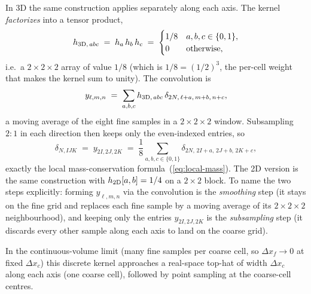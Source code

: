 \documentclass[12pt]{article}
\begin{document}
In 3D the same construction applies separately along each axis. The
kernel \emph{factorizes} into a tensor product,
\begin{equation}
  h_{3{\rm D},\,abc} \;=\; h_a\,h_b\,h_c
                     \;=\; \begin{cases}
                              1/8 & a,b,c\in\{0,1\},\\
                              0   & \text{otherwise},
                            \end{cases}
\end{equation}
i.e.\ a $2\!\times\!2\!\times\!2$ array of value $1/8$ (which is
$1/8 = (1/2)^3$, the per-cell weight that makes the kernel sum to
unity). The convolution is
\begin{equation}
  y_{\ell,m,n} \;=\; \sum_{a,b,c} h_{3{\rm D},\,abc}\,
                    \delta_{2N,\,\ell+a,\,m+b,\,n+c},
\end{equation}
a moving average of the eight fine samples in a $2\!\times\!2\!\times\!2$
window. Subsampling $2{:}1$ in each direction then keeps only the
even-indexed entries, so
\begin{equation}
  \delta_{N,IJK} \;=\; y_{2I,2J,2K}
                  \;=\; \frac{1}{8}\!\!\sum_{a,b,c\in\{0,1\}}\!\!
                        \delta_{2N,\,2I+a,\,2J+b,\,2K+c},
\end{equation}
exactly the local mass-conservation formula~(\ref{eq:local-mass}). The
2D version is the same construction with $h_{2{\rm D}}[a,b]=1/4$ on a
$2\!\times\!2$ block. To name the two steps explicitly: forming
$y_{\ell,m,n}$ via the convolution is the \emph{smoothing} step (it
stays on the fine grid and replaces each fine sample by a moving
average of its $2{\times}2{\times}2$ neighbourhood), and keeping only
the entries $y_{2I,2J,2K}$ is the \emph{subsampling} step (it discards
every other sample along each axis to land on the coarse grid).

In the continuous-volume limit (many fine samples per coarse cell, so
$\Delta x_f\to 0$ at fixed $\Delta x_c$) this discrete kernel approaches
a real-space top-hat of width $\Delta x_c$ along each axis (one coarse
cell), followed by point sampling at the coarse-cell centres.
\end{document}
